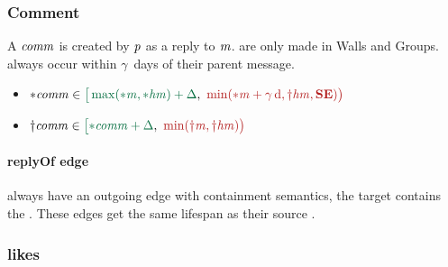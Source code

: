 

\subsubsection{Comment}

A \tComment $\mathit{comm}$ is created by \tPerson $\mathit{p}$ as a reply to \tMessage $\mathit{m}$. \tComments are only made in Walls and Groups. \tComment always occur within %
$\gamma$~days of their parent message. %

\begin{itemize}
    \item $\varc{\eComment} \in \interval{\max (\varc{\eMessage}, \varc{\eHasMember}) + \Delta}{\min (\varc{\eMessage} + \gamma\textrm{\,d}, \vard{\eHasMember}, \xSE)}$
    \item $\vard{\eComment} \in \interval{\varc{\eComment} + \Delta}{\min (\vard{\eMessage}, \vard{\eHasMember})}$
\end{itemize}

\paragraph{replyOf edge}

\tComments always have an outgoing \tReplyOf edge with containment semantics, \ie the target \tMessage contains the \tComment. These edges get the same lifespan as their source \tComment.

\subsubsection{likes}
\label{sec:likes}

